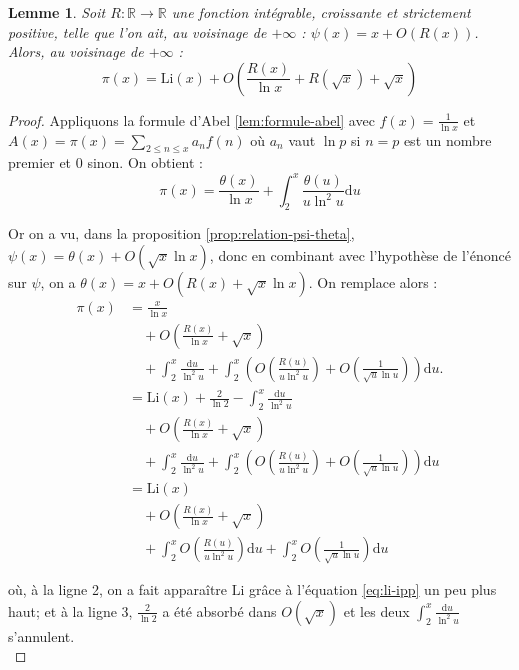 \documentclass[french]{report}
\newtheorem{lemma}[theorem]{Lemme}
\begin{document}
\begin{lemma}\label{lem:psi-x-r}
  Soit $R:\mathbb{R}\to\mathbb{R}$ une fonction intégrable, croissante et strictement positive, telle que l'on ait, au voisinage de $+\infty$ : $\psi(x)=x+O(R(x))$. Alors, au voisinage de $+\infty$ :
  \[
    \pi(x)
    = \mathrm{Li}(x)
    + O\left(\frac{R(x)}{\ln x} + R(\sqrt{x}) + \sqrt{x}\right)
  \]
\end{lemma}

\begin{proof}
  Appliquons la formule d'Abel \ref{lem:formule-abel} avec $f(x)=\frac{1}{\ln x}$ et $A(x)=\pi(x)=\sum_{2\leq n\leq x}a_nf(n)$ où $a_n$ vaut $\ln p$ si $n=p$ est un nombre premier et 0 sinon. On obtient :
  \[
    \pi(x)
    = \frac{\theta(x)}{\ln x}
    + \int_2^x{\frac{\theta(u)}{u\ln^2u}}\mathrm{d}u
  \]

  Or on a vu, dans la proposition \ref{prop:relation-psi-theta}, $\psi(x) = \theta(x)+O(\sqrt{x}\ln x)$, donc en combinant avec l'hypothèse de l'énoncé sur $\psi$, on a $\theta(x) = x + O(R(x)+\sqrt{x}\ln x)$. On remplace alors :
  \begin{align*}
    \pi(x)
    &= \frac{x}{\ln x} \\
    &\quad + O\left(\frac{R(x)}{\ln x} + \sqrt{x}\right) \\
    &\quad + \int_2^x\frac{\mathrm{d}u}{\ln^2 u}
    + \int_2^x\left( O\left(\frac{R(u)}{u\ln^2 u}\right) + O\left(\frac{1}{\sqrt{u}\ln u}\right) \right)\mathrm{d}u. \\
    &= \mathrm{Li}(x) + \frac{2}{\ln2} - \int_2^x{\frac{\mathrm{d}u}{\ln^2 u}}\\
    &\quad + O\left(\frac{R(x)}{\ln x} + \sqrt{x}\right) \\
    &\quad + \int_2^x\frac{\mathrm{d}u}{\ln^2 u}
    + \int_2^x\left( O\left(\frac{R(u)}{u\ln^2 u}\right) + O\left(\frac{1}{\sqrt{u}\ln u}\right) \right)\mathrm{d}u \\
    &= \mathrm{Li}(x) \\
    &\quad + O\left(\frac{R(x)}{\ln x} + \sqrt{x}\right) \\
    &\quad + \int_2^x O\left(\frac{R(u)}{u\ln^2 u}\right)\mathrm{d}u
    + \int_2^xO\left(\frac{1}{\sqrt{u}\ln u}\right)\mathrm{d}u
  \end{align*}

  où, à la ligne 2, on a fait apparaître $\mathrm{Li}$ grâce à l'équation \ref{eq:li-ipp} un peu plus haut; et à la ligne 3, $\frac{2}{\ln2}$ a été absorbé dans $O(\sqrt{x})$ et les deux $\int_2^x\frac{\mathrm{d}u}{\ln^2 u}$ s'annulent.
  \\


\end{proof}
\end{document}
